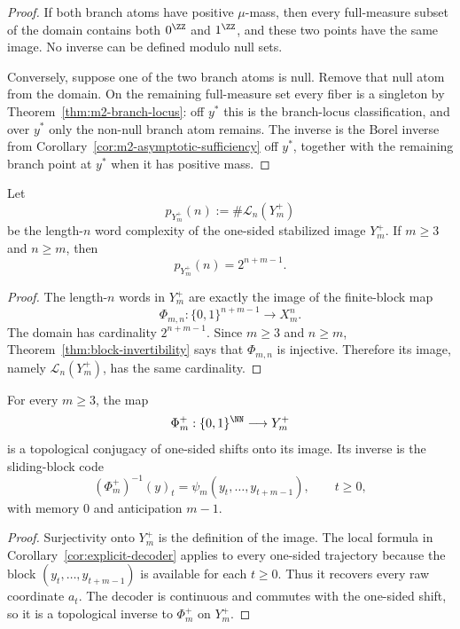 \begin{proof}
If both branch atoms have positive $\mu$-mass, then every full-measure subset
of the domain contains both $0^{\ZZ}$ and $1^{\ZZ}$, and these two points have
the same image.  No inverse can be defined modulo null sets.

Conversely, suppose one of the two branch atoms is null.  Remove that null
atom from the domain.  On the remaining full-measure set every fiber is a
singleton by Theorem~\ref{thm:m2-branch-locus}: off $y^\ast$ this is the
branch-locus classification, and over $y^\ast$ only the non-null branch atom
remains.  The inverse is the Borel inverse from
Corollary~\ref{cor:m2-asymptotic-sufficiency} off $y^\ast$, together with the
remaining branch point at $y^\ast$ when it has positive mass.
\end{proof}

\begin{corollary}\label{cor:one-sided-complexity}
Let
\[
p_{Y_m^+}(n):=\#\mathcal L_n(Y_m^+)
\]
be the length-$n$ word complexity of the one-sided stabilized image
$Y_m^+$.  If $m\ge3$ and $n\ge m$, then
\[
p_{Y_m^+}(n)=2^{n+m-1}.
\]
\end{corollary}

\begin{proof}
The length-$n$ words in $Y_m^+$ are exactly the image of the finite-block map
\[
\Phi_{m,n}:\{0,1\}^{n+m-1}\to X_m^n.
\]
The domain has cardinality $2^{n+m-1}$.  Since $m\ge3$ and $n\ge m$,
Theorem~\ref{thm:block-invertibility} says that $\Phi_{m,n}$ is injective.
Therefore its image, namely $\mathcal L_n(Y_m^+)$, has the same cardinality.
\end{proof}

\begin{corollary}\label{cor:one-sided-conjugacy}
For every $m\ge3$, the map
\[
\Phi_m^+:\{0,1\}^{\NN}\longrightarrow Y_m^+
\]
is a topological conjugacy of one-sided shifts onto its image.  Its inverse is
the sliding-block code
\[
(\Phi_m^+)^{-1}(y)_t=\psi_m(y_t,\ldots,y_{t+m-1}),
\qquad t\ge0,
\]
with memory $0$ and anticipation $m-1$.
\end{corollary}

\begin{proof}
Surjectivity onto $Y_m^+$ is the definition of the image.  The local formula
in Corollary~\ref{cor:explicit-decoder} applies to every one-sided trajectory
because the block $(y_t,\ldots,y_{t+m-1})$ is available for each $t\ge0$.
Thus it recovers every raw coordinate $a_t$.  The decoder is continuous and
commutes with the one-sided shift, so it is a topological inverse to
$\Phi_m^+$ on $Y_m^+$.
\end{proof}

